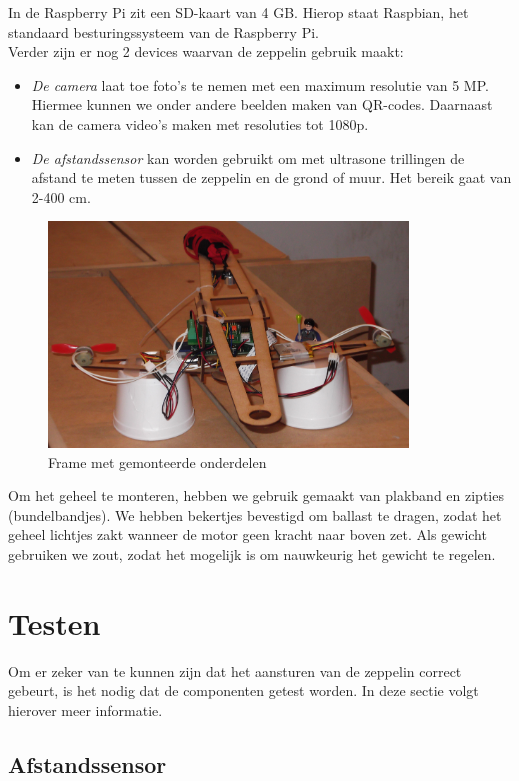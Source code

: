 \documentclass[eind]{penoverslag}
\begin{document}
In de Raspberry Pi zit een SD-kaart van 4 GB. Hierop staat Raspbian, het standaard besturingssysteem van de Raspberry Pi. \\

Verder zijn er nog 2 devices waarvan de zeppelin gebruik maakt:
\begin{itemize}
\item \emph{De camera} laat toe foto's te nemen met een maximum resolutie van 5 MP. Hiermee kunnen we onder andere beelden maken van QR-codes. Daarnaast kan de camera video's maken met resoluties tot 1080p.
\item \emph{De afstandssensor} kan worden gebruikt om met ultrasone trillingen de afstand te meten tussen de zeppelin en de grond of muur. Het bereik gaat van 2-400 cm. \\
\end{itemize}

\begin{figure}[ht!]
\centering
\includegraphics[height=60mm]{zeppelinFrame.jpg}
\caption{Frame met gemonteerde onderdelen}
\label{zeppFrame}
\end{figure}

Om het geheel te monteren, hebben we gebruik gemaakt van plakband en zipties (bundelbandjes). We hebben bekertjes bevestigd om ballast te dragen, zodat het geheel lichtjes zakt wanneer de motor geen kracht naar boven zet. Als gewicht gebruiken we zout, zodat het mogelijk is om nauwkeurig het gewicht te regelen. \\

\section{Testen}

Om er zeker van te kunnen zijn dat het aansturen van de zeppelin correct gebeurt, is het nodig dat de componenten getest worden. In deze sectie volgt hierover meer informatie.
\subsection{Afstandssensor}
\end{document}
